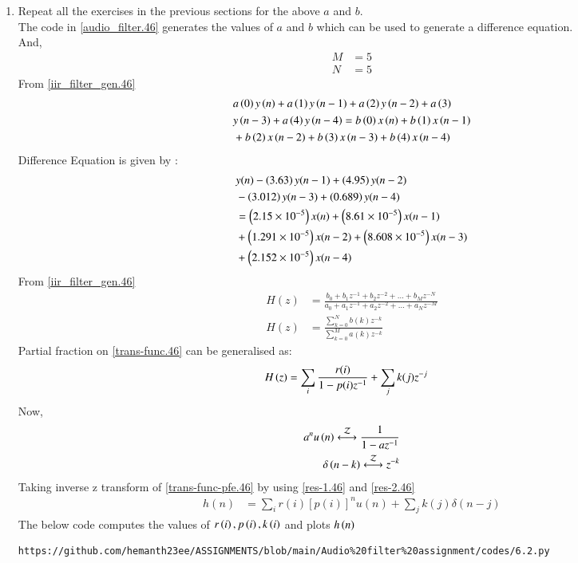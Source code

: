 \documentclass[journal,12pt,twocolumn]{IEEEtran}
\theoremstyle{remark}
\begin{document}
\begin{enumerate}
\item Repeat all the exercises in the previous sections for the above $a$ and $b$.\\
\solution The code in \ref{audio_filter.46} generates the values of $a$ and $b$  which can be used to generate a difference equation.\\
And,
\begin{align}
    M &= 5\\
    N&=5
\end{align}
From \ref{iir_filter_gen.46} 
\begin{align}
    &a\left(0\right)y\left(n\right) + a\left(1\right)y\left(n-1\right)+a\left(2\right)y\left(n-2\right)+a\left(3\right)\\ \notag &y\left(n-3\right) + a\left(4\right)y\left(n-4\right) =   b\left(0\right)x\left(n\right) + b\left(1\right)x\left(n-1\right)\\ \notag &+b\left(2\right)x\left(n-2\right)+b\left(3\right)x\left(n-3\right) + b\left(4\right)x\left(n-4\right) 
\end{align}
Difference Equation is given by :
\begin{align}
	&y(n) - \left(3.63\right)y(n - 1) + \left(4.95\right)y(n - 2) \nonumber \\
	&- \left(3.012\right)y(n - 3) + \left(0.689\right)y(n - 4) \nonumber \\
	&= \left(2.15\times 10^{-5}\right)x(n) + \left(8.61 \times 10^{-5}\right)x(n - 1) \nonumber \\
	&+ \left(1.291 \times 10^{-5}\right)x(n - 2) + \left(8.608 \times 10^{-5}\right)x(n - 3) \nonumber \\
	&+ \left(2.152 \times 10^{-5}\right)x(n - 4)
\end{align}
From \eqref{iir_filter_gen.46} 
\begin{align}
    H(z) &= \frac{b_0 + b_1 z^{-1} + b_2 z^{-2} + \ldots + b_M z^{-N}}{a_0 + a_1 z^{-1} + a_2 z^{-2} + \ldots + a_N z^{-M}}\\
    H(z) &= \frac{\sum_{k = 0}^{N}b(k)z^{-k}}{\sum_{k = 0}^{M}a(k)z^{-k}} \label{trans-func.46}
\end{align}
Partial fraction on \eqref{trans-func.46} can be generalised as:
\begin{align}
    H\left(z\right)&= \sum_{i}\frac{r(i)}{1 - p(i)z^{-1}} + \sum_{j}k(j)z^{-j}
	\label{trans-func-pfe.46}
\end{align}
Now,
\begin{align}
    a^{n}u\brak{n} \system{Z} \frac{1}{1-az^{-1}} \label{res-1.46}\\
    \delta\brak{n-k} \system{Z} z^{-k}\label{res-2.46}
\end{align}
Taking inverse z transform of \eqref{trans-func-pfe.46} by using \eqref{res-1.46} and \eqref{res-2.46}
\begin{align}
h(n) &= \sum_{i}r(i)[p(i)]^nu(n) + \sum_{j}k(j)\delta(n - j)
	\label{h-n-expr.46}
\end{align}
The below code computes the values of $r\left(i\right),p\left(i\right) , k\left(i\right)$ and plots $h\left(n\right)$
\begin{lstlisting}
https://github.com/hemanth23ee/ASSIGNMENTS/blob/main/Audio%20filter%20assignment/codes/6.2.py
\end{lstlisting}



\end{enumerate}
\end{document}
